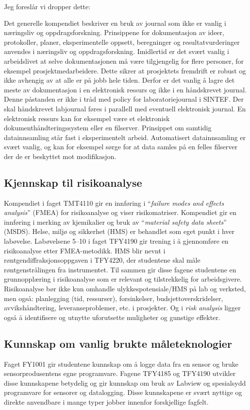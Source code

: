 \documentclass{article}
\begin{document}
{\color{green} Jeg foreslår vi dropper dette:

Det generelle kompendiet \cite{Persson2020} beskriver en bruk av journal som ikke er vanlig i næringsliv og oppdragsforskning. Prinsippene for dokumentasjon av ideer, protokoller, planer, eksperimentelle oppsett, beregninger og resultatvurderinger anvendes i næringsliv og oppdragsforskning. Imidlertid er det svært vanlig i arbeidslivet at selve dokumentasjonen må være tilgjengelig for flere personer, for eksempel prosjektmedarbeidere. Dette sikrer at prosjektets fremdrift er robust og ikke avhengig av at alle er på jobb hele tiden. Derfor er det vanlig å lagre det meste av dokumentasjon i en elektronisk ressurs og ikke i en håndskrevet journal. {\color{red}Denne påstanden er ikke i tråd med policy for laboratoriejournal i SINTEF. Der skal håndskrevet labjournal føres i parallell med eventuell elektronisk journal.} En elektronisk ressurs kan for eksempel være et elektronisk dokumenthåndteringssystem eller en filserver. Prinsippet om samtidig datainnsamling står fast i eksperimentelt arbeid. Automatisert datainnsamling er svært vanlig, og kan for eksempel sørge for at data samles på en felles filserver der de er beskyttet mot modifikasjon.
}

\subsection{Kjennskap til risikoanalyse}
Kompendiet i faget TMT4110 gir en innføring i ``\emph{failure modes and effects analysis}'' (FMEA) for risikoanalyse og viser risikomatriser. Kompendiet gir en innføring i merking av kjemikalier og bruk av ``\emph{material safety data sheets}'' (MSDS). Helse, miljø og sikkerhet (HMS) er behandlet som eget punkt i hver labøvelse. Labøvelsene 5--10 i faget TFY4190 gir trening i å gjennomføre en risikoanalyse etter FMEA-metodikk. HMS blir nevnt i røntgendiffraksjonsoppgaven i TFY4220, der studentene skal måle røntgenstrålingen fra instrumentet. Til sammen gir disse fagene studentene en grunnopplæring i risikoanalyse som er relevant og tilstrekkelig for arbeidsgivere.
{\color{red}Risikoanalyse bør ikke kun omhandle ulykkespotensiale/HMS på lab og verksted, men også: planlegging (tid, ressurser), forsinkelser, budsjettoverskridelser,  avvikshåndtering, leveranseproblemer, etc. i prosjekter. Og i \emph{risk analysis} ligger også å identifisere og utnytte uforutsette muligheter og gunstige effekter.}

\subsection{Kunnskap om vanlig brukte måleteknologier}
\label{Teknikker}
Faget FY1001 gir studentene kunnskap om å logge data fra en sensor og bruke sensorprodusentens egne programvare. Fagene TFY4185 og TFY4190 utvikler disse kunnskapene betydelig og gir kunnskap om bruk av Labview og spesialsydd programvare for sensorer og datalogging. Disse kunnskapene er svært nyttige og direkte anvendbare i mange typer jobber innenfor forskjellige fagfelt.
\end{document}
